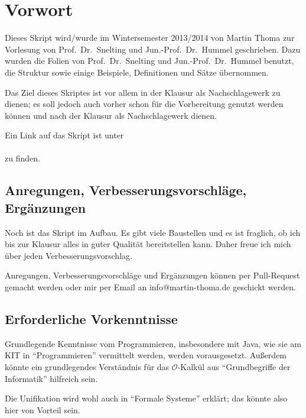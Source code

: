 \chapter*{Vorwort}
Dieses Skript wird/wurde im Wintersemester 2013/2014
von Martin Thoma zur Vorlesung von Prof.~Dr.~Snelting und Jun.-Prof.~Dr.~Hummel 
geschrieben. Dazu wurden
die Folien von Prof.~Dr.~Snelting und Jun.-Prof.~Dr.~Hummel benutzt, die Struktur
sowie einige Beispiele, Definitionen und Sätze übernommen.

Das Ziel dieses Skriptes ist vor allem
in der Klausur als Nachschlagewerk zu dienen; es soll jedoch auch
vorher schon für die Vorbereitung genutzt werden können und nach
der Klausur als Nachschlagewerk dienen.

Ein Link auf das Skript ist unter \\
\href{http://martin-thoma.com/programmierparadigmen/}{}\\
zu finden.

\section*{Anregungen, Verbesserungsvorschläge, Ergänzungen}
Noch ist das Skript im Aufbau. Es gibt viele Baustellen und es ist
fraglich, ob ich bis zur Klausur alles in guter Qualität bereitstellen
kann. Daher freue ich mich über jeden Verbesserungsvorschlag.

Anregungen, Verbesserungsvorschläge und Ergänzungen können per
Pull-Request gemacht werden oder mir per Email an info@martin-thoma.de
geschickt werden.

\section*{Erforderliche Vorkenntnisse}
Grundlegende Kenntnisse vom Programmieren, insbesondere mit Java,
wie sie am KIT in \enquote{Programmieren} vermittelt werden, werden
vorausgesetzt. Außerdem könnte ein grundlegendes Verständnis für 
das $\mathcal{O}$-Kalkül aus \enquote{Grundbegriffe der Informatik} hilfreich sein.

Die Unifikation wird wohl auch in \enquote{Formale Systeme}
erklärt; das könnte also hier von Vorteil sein.
